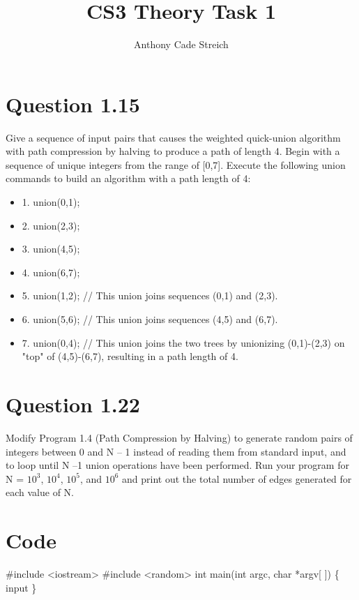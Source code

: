 \documentclass[]{article}
\title{CS3 Theory Task 1}
\author{Anthony Cade Streich}
\begin{document}
\maketitle
\section*{Question 1.15}
Give a sequence of input pairs that causes the weighted quick-union algorithm with path compression by halving to produce a path of length 4.
\newline
\newline
\newline
Begin with a sequence of unique integers from the range of [0,7]. Execute the following union commands to build an algorithm with a path length of 4:

\begin{itemize}
	\item {1. union(0,1);}
	\item {2. union(2,3);}
	\item {3. union(4,5);}
	\item {4. union(6,7);}
	
	\item {5. union(1,2); // This union joins sequences (0,1) and (2,3).}
	\item {6. union(5,6); // This union joins sequences (4,5) and (6,7).}
	\item {7. union(0,4); // This union joins the two trees by unionizing (0,1)-(2,3) on "top" of (4,5)-(6,7), resulting in a path length of 4.}
\end{itemize}

\pagebreak

\section*{Question 1.22}
Modify Program 1.4 (Path Compression by Halving) to generate random pairs of integers between 0 and N – 1 instead of reading them from standard input, and to loop until N –1 union operations have been performed. Run your program for N = $10^{3}$, $10^{4}$, $10^{5}$, and $10^{6}$ and print out the total number of edges generated for each value of N.

\section*{Code}
\#include <iostream>\newline
\#include <random>\newline
\newline
int main(int argc, char *argv[ ])\newline
\{\newline
\indent input
\newline \}
\end{document}
